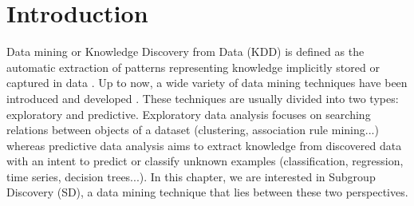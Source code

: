 
\graphicspath{{./_figures/06_sd/}}

\section{Introduction}\label{section:SD:introduction}
Data mining or Knowledge Discovery from Data (KDD) is defined as the automatic extraction of patterns representing knowledge implicitly stored or captured in data \cite{Fayyad1996}. Up to now, a wide variety of data mining techniques have been introduced and developed \cite{Han2012}. These techniques are usually divided into two types: exploratory and predictive. Exploratory data analysis focuses on searching relations between objects of a dataset (clustering, association rule mining...) whereas predictive data analysis aims to extract knowledge from discovered data with an intent to predict or classify unknown examples (classification, regression, time series, decision trees...). In this chapter, we are interested in Subgroup Discovery (SD), a data mining technique that lies between these two perspectives.



